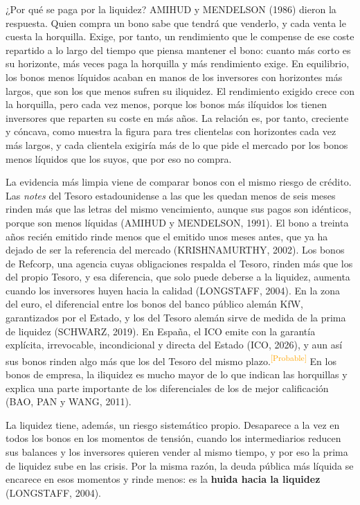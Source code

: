 \documentclass[10pt,a4paper]{article}
\begin{document}
¿Por qué se paga por la liquidez? AMIHUD y MENDELSON (1986) dieron la respuesta. Quien compra un bono sabe que tendrá que venderlo, y cada venta le cuesta la horquilla. Exige, por tanto, un rendimiento que le compense de ese coste repartido a lo largo del tiempo que piensa mantener el bono: cuanto más corto es su horizonte, más veces paga la horquilla y más rendimiento exige. En equilibrio, los bonos menos líquidos acaban en manos de los inversores con horizontes más largos, que son los que menos sufren su iliquidez. El rendimiento exigido crece con la horquilla, pero cada vez menos, porque los bonos más ilíquidos los tienen inversores que reparten su coste en más años. La relación es, por tanto, creciente y cóncava, como muestra la figura para tres clientelas con horizontes cada vez más largos, y cada clientela exigiría más de lo que pide el mercado por los bonos menos líquidos que los suyos, que por eso no compra.

La evidencia más limpia viene de comparar bonos con el mismo riesgo de crédito. Las \textit{notes} del Tesoro estadounidense a las que les quedan menos de seis meses rinden más que las letras del mismo vencimiento, aunque sus pagos son idénticos, porque son menos líquidas (AMIHUD y MENDELSON, 1991). El bono a treinta años recién emitido rinde menos que el emitido unos meses antes, que ya ha dejado de ser la referencia del mercado (KRISHNAMURTHY, 2002). Los bonos de Refcorp, una agencia cuyas obligaciones respalda el Tesoro, rinden más que los del propio Tesoro, y esa diferencia, que solo puede deberse a la liquidez, aumenta cuando los inversores huyen hacia la calidad (LONGSTAFF, 2004). En la zona del euro, el diferencial entre los bonos del banco público alemán KfW, garantizados por el Estado, y los del Tesoro alemán sirve de medida de la prima de liquidez (SCHWARZ, 2019). En España, el ICO emite con la garantía explícita, irrevocable, incondicional y directa del Estado (ICO, 2026), y aun así sus bonos rinden algo más que los del Tesoro del mismo plazo.\textcolor{orange}{\textsuperscript{[Probable]}} En los bonos de empresa, la iliquidez es mucho mayor de lo que indican las horquillas y explica una parte importante de los diferenciales de los de mejor calificación (BAO, PAN y WANG, 2011).

La liquidez tiene, además, un riesgo sistemático propio. Desaparece a la vez en todos los bonos en los momentos de tensión, cuando los intermediarios reducen sus balances y los inversores quieren vender al mismo tiempo, y por eso la prima de liquidez sube en las crisis. Por la misma razón, la deuda pública más líquida se encarece en esos momentos y rinde menos: es la \textbf{huida hacia la liquidez} (LONGSTAFF, 2004).
\end{document}
